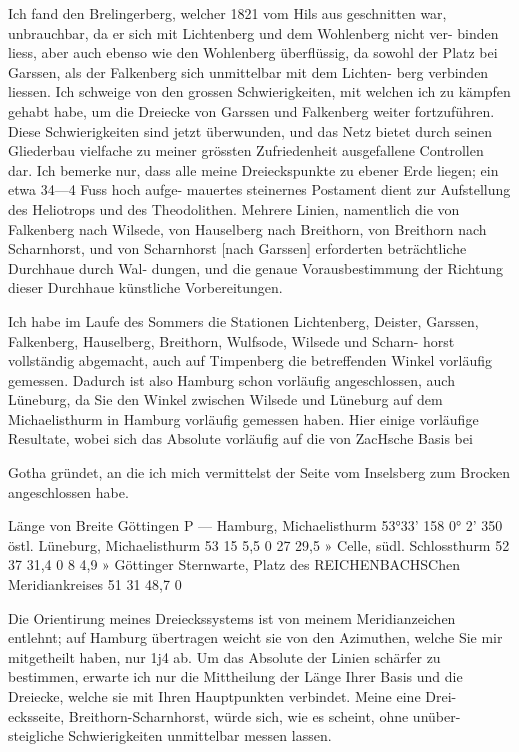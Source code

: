 \documentclass[12pt,a4paper]{article}
\theoremstyle{plain}
\theoremstyle{definition}
\theoremstyle{remark}
\begin{document}
\noindent
Ich fand den Brelingerberg, welcher 1821 vom Hils aus geschnitten war,
unbrauchbar, da er sich mit Lichtenberg und dem Wohlenberg nicht ver-
binden liess, aber auch ebenso wie den Wohlenberg überflüssig, da sowohl
der Platz bei Garssen, als der Falkenberg sich unmittelbar mit dem Lichten-
berg verbinden liessen. Ich schweige von den grossen Schwierigkeiten, mit
welchen ich zu kämpfen gehabt habe, um die Dreiecke von Garssen und
Falkenberg weiter fortzuführen. Diese Schwierigkeiten sind jetzt überwunden,
und das Netz bietet durch seinen Gliederbau vielfache zu meiner grössten
Zufriedenheit ausgefallene Controllen dar. Ich bemerke nur, dass alle meine
Dreieckspunkte zu ebener Erde liegen; ein etwa 34---4 Fuss hoch aufge-
mauertes steinernes Postament dient zur Aufstellung des Heliotrops und des
Theodolithen. Mehrere Linien, namentlich die von Falkenberg nach Wilsede,
von Hauselberg nach Breithorn, von Breithorn nach Scharnhorst, und von
Scharnhorst [nach Garssen] erforderten beträchtliche Durchhaue durch Wal-
dungen, und die genaue Vorausbestimmung der Richtung dieser Durchhaue
künstliche Vorbereitungen.

\noindent
Ich habe im Laufe des Sommers die Stationen Lichtenberg, Deister,
Garssen, Falkenberg, Hauselberg, Breithorn, Wulfsode, Wilsede und Scharn-
horst vollständig abgemacht, auch auf Timpenberg die betreffenden Winkel
vorläufig gemessen. Dadurch ist also Hamburg schon vorläufig angeschlossen,
auch Lüneburg, da Sie den Winkel zwischen Wilsede und Lüneburg auf dem
Michaelisthurm in Hamburg vorläufig gemessen haben. Hier einige vorläufige
Resultate, wobei sich das Absolute vorläufig auf die von ZacHsche Basis bei

\noindent

\noindent

\noindent
Gotha gründet, an die ich mich vermittelst der Seite vom Inselsberg zum
Brocken angeschlossen habe.

\noindent
Länge von
Breite Göttingen
P ---
Hamburg, Michaelisthurm 53°33' 158 0° 2' 350 östl.
Lüneburg, Michaelisthurm 53 15 5,5 0 27 29,5 »
Celle, südl. Schlossthurm 52 37 31,4 0 8 4,9 »
Göttinger Sternwarte, Platz
des REICHENBACHSChen
Meridiankreises 51 31 48,7 0

\noindent
Die Orientirung meines Dreieckssystems ist von meinem Meridianzeichen
entlehnt; auf Hamburg übertragen weicht sie von den Azimuthen, welche Sie
mir mitgetheilt haben, nur 1j4 ab. Um das Absolute der Linien schärfer zu
bestimmen, erwarte ich nur die Mittheilung der Länge Ihrer Basis und die
Dreiecke, welche sie mit Ihren Hauptpunkten verbindet. Meine eine Drei-
ecksseite, Breithorn-Scharnhorst, würde sich, wie es scheint, ohne unüber-
steigliche Schwierigkeiten unmittelbar messen lassen.
\end{document}
